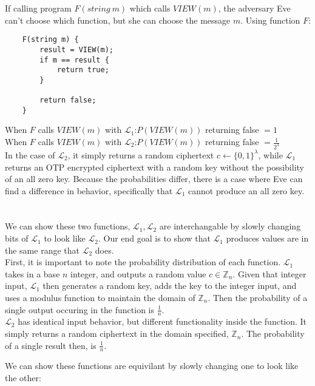 \documentclass[10pt,letterpaper]{article}
\begin{document}
	If calling program $F(string\ m)$ which calls $VIEW(m)$, the adversary
	Eve can't choose which function, but she can choose the message $m$.
	Using function $F$:\\
	\clearpage

	\begin{lstlisting}
	F(string m) {
		result = VIEW(m);
		if m == result {
			return true;
		}
		
		return false;
	}
	\end{lstlisting}
	\noindent When $F$ calls $VIEW(m)$ with $\mathcal{L}_1$:$P(VIEW(m)) $ returning false
	$= 1$\\
	When $F$ calls $VIEW(m)$ with $\mathcal{L}_2$:$P(VIEW(m))$ returning false $=
	\frac{1}{2^\lambda}$\\
	
	In the case of $\mathcal{L}_2$, it simply
	returns a random ciphertext $c \leftarrow \{0,1\}^\lambda$, while
	$\mathcal{L}_1$ returns an OTP encrypted ciphertext with a random key
	without the possibility of an all zero key. Because the probabilities
	differ, there is a case where Eve can find a difference in behavior,
	specifically that $\mathcal{L}_1$ cannot produce an all zero key. 

\section{}
	We can show these two functions, $\mathcal{L}_1, \mathcal{L}_2$ are 
	interchangable by slowly changing bits of $\mathcal{L}_1$ to look like
	$\mathcal{L}_2$. Our end goal is to show that $\mathcal{L}_1$ produces
	values are in the same range that $\mathcal{L}_2$ does.\\

	First, it is important to note the probability distribution of each
	function. $\mathcal{L}_1$ takes in a base $n$ integer, and outputs
	a random value $c \in \mathbb{Z}_n$. Given that integer input,
	$\mathcal{L}_1$ then generates a random key, adds the key to the integer
	input, and uses a modulus function to maintain the domain of
	$\mathbb{Z}_n$. Then the probability of a single output occuring in the
	function is $\frac{1}{n}$.\\

	$\mathcal{L}_2$ has identical input behavior, but different
	functionality inside the function. It simply returns a random ciphertext
	in the domain specified, $\mathbb{Z}_n$. The probability of a single
	result then, is $\frac{1}{n}$.

	We can show these functions are equivilant by slowly changing one to
	look like the other:
\end{document}
